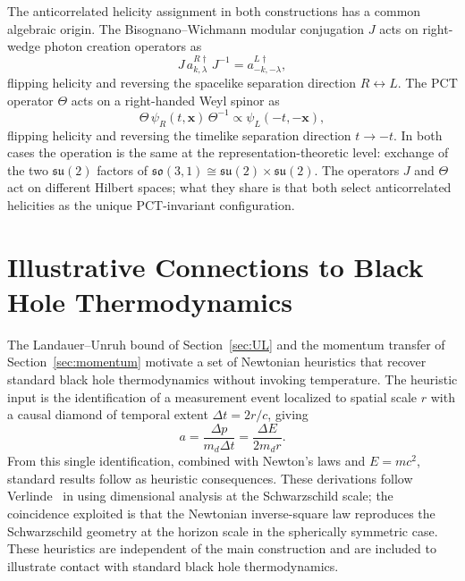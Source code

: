 \documentclass[12pt,a4paper]{article}
\begin{document}
The anticorrelated helicity assignment in both 
constructions has a common algebraic origin. The 
Bisognano--Wichmann modular conjugation $J$ acts on 
right-wedge photon creation operators as
%
\begin{equation}
    J\, a^{R\dagger}_{k,\lambda}\, J^{-1} 
    = a^{L\dagger}_{-k,-\lambda},
\end{equation}
%
flipping helicity and reversing the spacelike separation 
direction $R \leftrightarrow L$. The PCT operator 
$\Theta$ acts on a right-handed Weyl spinor as
%
\begin{equation}
    \Theta\, \psi_R(t,\mathbf{x})\, \Theta^{-1} 
    \propto \psi_L(-t,-\mathbf{x}),
\end{equation}
%
flipping helicity and reversing the timelike separation 
direction $t \to -t$. In both cases the operation is 
the same at the representation-theoretic level: exchange 
of the two $\mathfrak{su}(2)$ factors of 
$\mathfrak{so}(3,1) \cong \mathfrak{su}(2) \times 
\mathfrak{su}(2)$. The operators $J$ and $\Theta$ act 
on different Hilbert spaces; what they share is that 
both select anticorrelated helicities as the unique 
PCT-invariant configuration.

\section{Illustrative Connections to Black Hole Thermodynamics}
\label{sec:heuristics_appendix}

The Landauer--Unruh bound of Section~\ref{sec:UL} 
and the momentum transfer of Section~\ref{sec:momentum} 
motivate a set of Newtonian heuristics that recover 
standard black hole thermodynamics without invoking 
temperature. The heuristic input is the identification 
of a measurement event localized to spatial scale $r$ 
with a causal diamond of temporal extent $\Delta t = 
2r/c$, giving
\begin{equation}
a = \frac{\Delta p}{m_d \Delta t} = \frac{\Delta E}{2 m_d r}.
\label{eq:accel_app}
\end{equation}
From this single identification, combined with 
Newton's laws and $E = mc^2$, standard results follow 
as heuristic consequences. These derivations follow 
Verlinde~\cite{entropic} in using dimensional analysis 
at the Schwarzschild scale; the coincidence exploited 
is that the Newtonian inverse-square law reproduces 
the Schwarzschild geometry at the horizon scale in the 
spherically symmetric case.
These heuristics are independent of the main construction and are included to illustrate contact with standard black hole thermodynamics.
\end{document}
